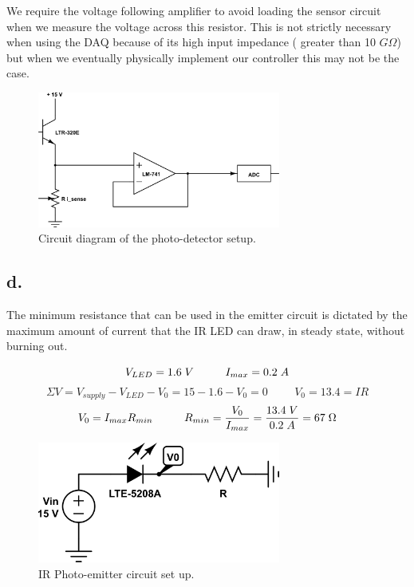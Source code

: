 \documentclass{article}
\theoremstyle{plain}
\theoremstyle{definition}
\theoremstyle{remark}
\begin{document}
We require the voltage following amplifier to avoid loading the sensor circuit when we measure the voltage across this resistor.  This is not strictly necessary when using the DAQ because of its high input impedance ( greater than 10 $G\Omega$) but when we eventually physically implement our controller this may not be the case.  


\begin{figure}[h]
\begin{center}
\includegraphics[width=8cm]{lab2_sensorckt.png}
\end{center}
\caption{Circuit diagram of the photo-detector setup.}
\label{q1_c}
\end{figure}


\subsection*{d.}
The minimum resistance that can be used in the emitter circuit is dictated by the maximum amount of current that the IR LED can draw, in steady state, without burning out.  

$$ V_{LED}=1.6 \hspace{0.1cm} V \hspace{1cm} I_{max} = 0.2 \hspace{0.1cm} A $$ 
$$ \Sigma{V} = V_{supply} - V_{LED} - V_0 = 15 - 1.6 - V_0 = 0 \hspace{1cm} V_0=13.4=IR $$
$$ V_0=I_{max}R_{min} \hspace{1cm} R_{min}=\frac{V_0}{I_{max}}=\frac{13.4 \hspace{0.1cm} V}{0.2 \hspace{0.1cm} A} = 67\hspace{0.1cm} \Omega$$


\begin{figure}[h]
\begin{center}
\includegraphics[width=8cm]{lab2_emitter.png}
\end{center}
\caption{IR Photo-emitter circuit set up.}
\label{q1_d}
\end{figure}
\end{document}
